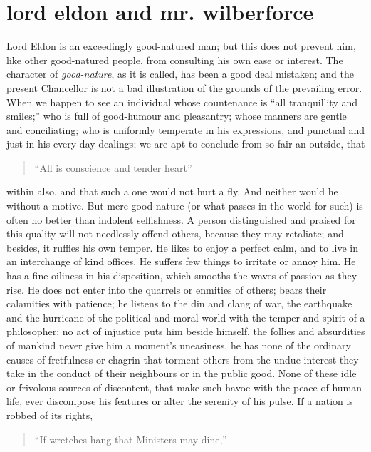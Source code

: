 \chapter[Lord Eldon and Mr. Wilberforce]
{lord eldon {\normalsize and} mr. wilberforce}

Lord Eldon is an exceedingly good-natured man; but this does not
prevent him, like other good-natured people, from consulting his
own ease or interest. The character of \emph{good-nature}, as it
is called, has been a good deal mistaken; and the present
Chancellor is not a bad illustration of the grounds of the
prevailing error. When we happen to see an individual whose
countenance is ``all tranquillity and smiles;'' who is full of
good-humour and pleasantry; whose manners are gentle and
conciliating; who is uniformly temperate in his expressions, and
punctual and just in his every-day dealings; we are apt to
conclude from so fair an outside, that
\begin{quote}
  ``All is conscience and tender heart''

\end{quote}
within also, and that such a one would not hurt a fly. And neither
would he without a motive. But mere good-nature (or what passes in
the world for such) is often no better than indolent
selfishness. A person distinguished and praised for this quality
will not needlessly offend others, because they may retaliate; and
besides, it ruffles his own temper. He likes to enjoy a perfect
calm, and to live in an interchange of kind offices. He suffers
few things to irritate or annoy him. He has a fine oiliness in his
disposition, which smooths the waves of passion as they rise. He
does not enter into the quarrels or enmities of others; bears
their calamities with patience; he listens to the din and clang of
war, the earthquake and the hurricane of the political and moral
world with the temper and spirit of a philosopher; no act of
injustice puts him beside himself, the follies and absurdities of
mankind never give him a moment's uneasiness, he has none of the
ordinary causes of fretfulness or chagrin that torment others from
the undue interest they take in the conduct of their neighbours or
in the public good. None of these idle or frivolous sources of
discontent, that make such havoc with the peace of human life,
ever discompose his features or alter the serenity of his
pulse. If a nation is robbed of its rights,
\begin{quote}
  ``If wretches hang that Ministers may dine,''\textemdash

\end{quote}
